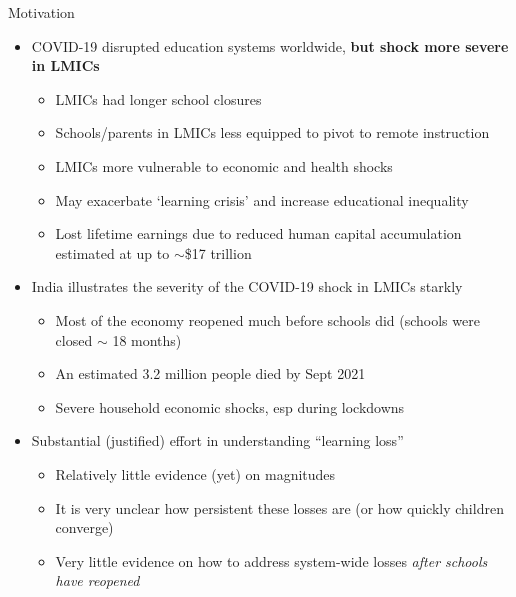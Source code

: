 \documentclass[aspectratio=169,numbering=none]{beamer}
\begin{document}
\begin{frame}[plain]{Motivation }
\begin{itemize}
\vfill\item COVID-19 disrupted education systems worldwide, \textbf{but shock more severe in LMICs}
\begin{itemize}
\vfill\item LMICs had longer school closures  \cite{imf_school_closures, unesco_school_closures}
\vfill\item Schools/parents in LMICs less equipped to pivot to remote instruction
\vfill\item LMICs more vulnerable to economic and health shocks \cite{patrinos2022analysis}
\vfill\item May exacerbate `learning crisis' and increase educational inequality \cite{world2020covid}
\vfill\item Lost lifetime earnings due to reduced human capital accumulation estimated at up to $\sim$\$17 trillion  \cite{world2021covid}
\end{itemize}
\pause
\vfill\item India illustrates the severity of the COVID-19 shock in LMICs starkly
\begin{itemize}
\vfill\item Most of the economy reopened much before schools did (schools were closed $\sim$ 18 months)
\vfill\item An estimated 3.2 million people died by Sept 2021 \cite{jha2022covid}
\vfill\item Severe household economic shocks, esp during lockdowns \cite{kesar2021pandemic}
\end{itemize}
\pause
\vfill\item Substantial (justified) effort in understanding ``learning loss''
\begin{itemize}
\vfill\item Relatively little evidence (yet) on magnitudes \cite{Pratham2021CG}
\vfill\item It is very unclear how persistent these losses are (or how quickly children converge)
\vfill \item Very little evidence on how to address system-wide losses \emph{after schools have reopened}

\end{itemize}
\end{itemize}
\end{frame}
\end{document}
